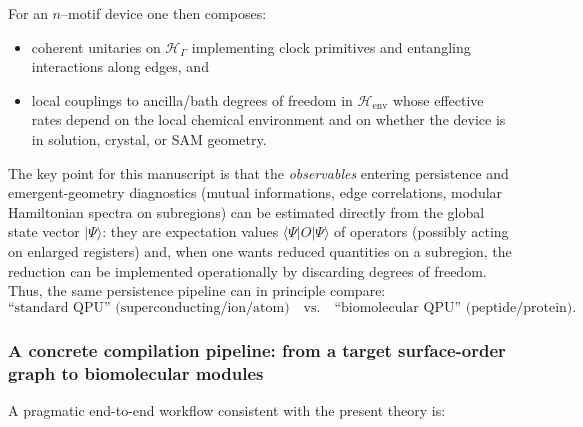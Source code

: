 \documentclass[11pt,oneside]{amsbook}
\numberwithin{equation}{section}
\theoremstyle{plain}
\theoremstyle{definition}
\theoremstyle{remark}
\newcommand{\ket}[1]{\lvert #1 \rangle}
\begin{document}
For an $n$--motif device one then composes:
\begin{itemize}
\item coherent unitaries on $\mathcal{H}_\Gamma$ implementing clock primitives and entangling interactions along edges, and
\item local couplings to ancilla/bath degrees of freedom in $\mathcal{H}_{\mathrm{env}}$ whose effective rates depend on the local chemical environment and on whether the device is in solution, crystal, or SAM geometry.
\end{itemize}

The key point for this manuscript is that the \emph{observables} entering persistence and emergent-geometry diagnostics
(mutual informations, edge correlations, modular Hamiltonian spectra on subregions) can be estimated directly from the global
state vector $\ket{\Psi}$:
they are expectation values $\langle\Psi|O|\Psi\rangle$ of operators (possibly acting on enlarged registers) and, when one wants reduced
quantities on a subregion, the reduction can be implemented operationally by discarding degrees of freedom.
Thus, the same persistence pipeline can in principle compare:
\[
  \text{``standard QPU'' (superconducting/ion/atom)} \quad \text{vs.} \quad \text{``biomolecular QPU'' (peptide/protein)}.
\]

\subsubsection{A concrete compilation pipeline: from a target surface-order graph to biomolecular modules}
A pragmatic end-to-end workflow consistent with the present theory is:
\end{document}
